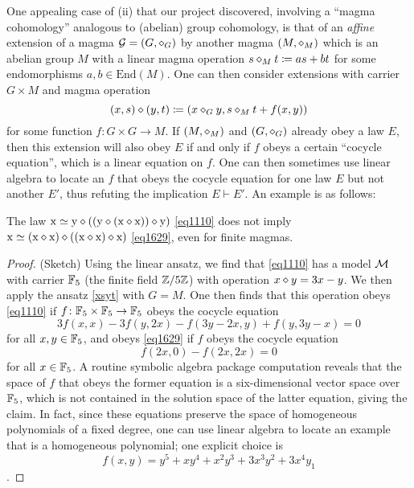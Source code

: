 One appealing case of (ii) that our project discovered, involving a ``magma cohomology'' analogous to (abelian) group cohomology, is that of an \emph{affine} extension of a magma ${\mathcal G} = (G,\diamond_G)$ by another magma $(M,\diamond_M)$ which is an abelian group $M$ with a linear magma operation $s \diamond_M t \coloneqq as + bt$ for some endomorphisms $a,b \in \mathrm{End}(M)$.  One can then consider extensions with carrier $G \times M$ and magma operation
\begin{equation}\label{xsyt}
 (x, s) \diamond (y, t) \coloneqq (x \diamond_G y, s \diamond_M t + f(x,y))
\end{equation}
for some function $f \colon G \times G \to M$.  If $(M,\diamond_M)$ and $(G,\diamond_G)$ already obey a law $E$, then this extension will also obey $E$ if and only if $f$ obeys a certain ``cocycle equation'', which is a linear equation on $f$.  One can then sometimes use linear algebra to locate an $f$ that obeys the cocycle equation for one law $E$ but not another $E'$, thus refuting the implication $E \vdash E'$.  An example is as follows:

\begin{proposition}\label{1110-1629} The law $\mathrm{x} \simeq \mathrm{y} \diamond ((\mathrm{y} \diamond (\mathrm{x} \diamond \mathrm{x})) \diamond \mathrm{y})$ \eqref{eq1110} does not imply $\mathrm{x} \simeq (\mathrm{x} \diamond \mathrm{x}) \diamond ((\mathrm{x} \diamond \mathrm{x}) \diamond \mathrm{x})$ \eqref{eq1629}, even for finite magmas.
\end{proposition}

\begin{proof}  (Sketch) Using the linear ansatz, we find that \eqref{eq1110} has a model ${\mathcal{M}}$ with carrier $\mathbb{F}_5$ (the finite field $\mathbb{Z}/5\mathbb{Z}$) with operation $x \diamond y = 3x-y$.  We then apply the ansatz \eqref{xsyt} with $G=M$.  One then finds that this operation obeys \eqref{eq1110} if $f \colon \mathbb{F}_5 \times \mathbb{F}_5 \to \mathbb{F}_5$ obeys the cocycle equation
  $$3f(x,x) - 3f(y,2x) - f(3y-2x,y) + f(y,3y-x) = 0$$
for all $x,y \in \mathbb{F}_5$, and obeys \eqref{eq1629} if $f$ obeys the cocycle equation
$$ f(2x,0) - f(2x,2x) = 0$$
for all $x \in \mathbb{F}_5$.  A routine symbolic algebra package computation reveals that the space of $f$ that obeys the former equation is a six-dimensional vector space over $\mathbb{F}_5$, which is not contained in the solution space of the latter equation, giving the claim.
In fact, since these equations preserve the space of homogeneous polynomials of a fixed degree, one can use linear algebra to locate an example that is a homogeneous polynomial; one explicit choice is $$f(x,y) = y^5 +xy^4 + x^2y^3 +3x^3 y^2 + 3x^4 y_1$$.
\end{proof}


